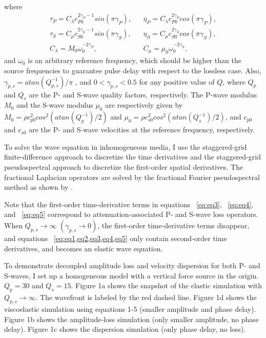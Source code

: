 where
\begin{eqnarray}
\label{eq:eq8}
\tau_P = C_{\lambda} c_{P0}^{2\gamma_P-1}sin(\pi\gamma_P ),&& \eta_P=C_\lambda c_{P0}^{2\gamma_P}cos(\pi\gamma_P ),\nonumber \\
\tau_S = C_\mu c_{S0}^{2\gamma_S-1}sin(\pi\gamma_S ),&& \eta_S=C_\mu c_{S0}^{2\gamma_S}cos(\pi\gamma_S ),\nonumber \\
C_{\lambda}=M_{0}\omega_0^{-2\gamma_P}, && C_\mu=\mu_{0}\omega_0^{-2\gamma_S},
\end{eqnarray}
and $\omega_0$ is an arbitrary reference frequency, which should be higher than the source frequencies to guarantee pulse delay with respect to the lossless case. Also, $\gamma_{p,s}=atan(Q_{p,s}^{-1})/\pi $ , and $0<\gamma_{p,s}<0.5$ for any positive value of $Q$, where  $Q_p$ and $Q_s$ are the P- and S-wave quality factors, respectively. The P-wave modulus  $M_0$ and the S-wave modulus $\mu_0$  are respectively given by $M_0=\rho c_{p0}^2cos^2(atan(Q_p^{-1})/2)$ and $\mu_0=\rho c_{s0}^2cos^2(atan(Q_s^{-1})/2)$, and $c_{p0}$  and $c_{s0}$   are the P- and S-wave velocities at the reference frequency, respectively. 

To solve the wave equation in inhomogeneous media, I use the staggered-grid finite-difference approach to discretize the time derivatives and the staggered-grid pseudospectral approach to discretize the first-order spatial derivatives. The fractional Laplacian operators are solved by the fractional Fourier pseudospectral method as shown by \cite[]{zhu14a}. 

Note that the first-order time-derivative terms in equations ~\ref{eq:eq3}, ~\ref{eq:eq4}, and ~\ref{eq:eq5} correspond to attenuation-associated P- and S-wave loss operators. When $Q_{p,s}\rightarrow \infty$   $(\gamma_{p,s}\rightarrow 0 )$, the first-order time-derivative terms disappear, and equations ~\ref{eq:eq1,eq2,eq3,eq4,eq5} only contain second-order time derivatives, and becomes an elastic wave equation. 

To demonstrate decoupled amplitude loss and velocity dispersion for both P- and S-waves, I set up a homogeneous model with a vertical force source in the origin. $Q_p=30$ and $Q_s=15$. Figure 1a shows the snapshot of the elastic simulation with $Q_{p,s}\rightarrow \infty$. The wavefront is labeled by the red dashed line. Figure 1d shows the viscoelastic simulation using equations 1-5 (smaller amplitude and phase delay). Figure 1b shows the amplitude-loss simulation (only smaller amplitude, no phase delay). Figure 1c shows the dispersion simulation (only phase delay, no loss).

